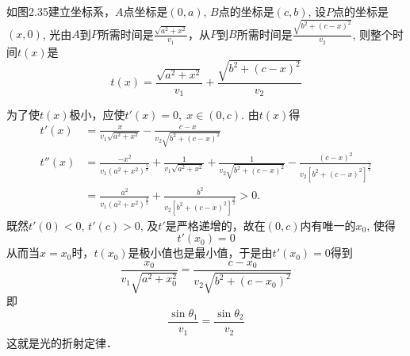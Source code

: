 \begin{solution}
如图2.35建立坐标系，$A$点坐标是$(0,a)$, $B$点的坐标是$(c,b)$, 设$P$点的坐标是$(x,0)$, 光由$A$到$P$所需时间是$\frac{\sqrt{a^2+x^2}}{v_1}$，从$P$到$B$所需时间是$\frac{\sqrt{b^2+(c-x)^2}}{v_2}$, 
则整个时间$t(x)$是
\[t (x) =\frac{\sqrt{a^2+x^2}}{v_1}+\frac{\sqrt{b^2+(c-x)^2}}{v_2}\]

为了使$t(x)$极小，应使$t'(x)=0,\; x\in (0,c)$. 由$t(x)$得
\begin{align*}
    t' (x) &=\frac{x}{v_1\sqrt{a^2+x^2}}-\frac{c-x}{v_2\sqrt{b^2+(c-x)^2}}\\
    t'' (x) &=\frac{-x^2}{v_1(a^2+x^2)^{\tfrac{3}{2}}}+\frac{1}{v_1\sqrt{a^2+x^2}}+\frac{1}{v_2\sqrt{b^2+(c-x)^2}}-\frac{(c-x)^2}{v_2\left[b^2+(c-x)^2\right]^{\tfrac{3}{2}}}\\
    &=\frac{a^2}{v_1(a^2+x^2)^{\tfrac{3}{2}}}+\frac{b^2}{v_2\left[b^2+(c-x)^2\right]^{\tfrac{3}{2}}}>0.
\end{align*}
既然$t'(0)<0$, $t'(c)>0$, 及$t'$是严格递增的，故在$(0,c)$内有唯一的$x_0$, 使得
\[t'(x_0)=0\]
从而当$x=x_0$时，$t(x_0)$是极小值也是最小值，于是由$t'(x_0)=0$得到
\[\frac{x_0}{v_1\sqrt{a^2+x^2_0}}=\frac{c-x_0}{v_2\sqrt{b^2+(c-x_0)^2}}\]
即
\[\frac{\sin\theta_1}{v_1}=\frac{\sin\theta_2}{v_2}\]
这就是光的折射定律．
\end{solution}

